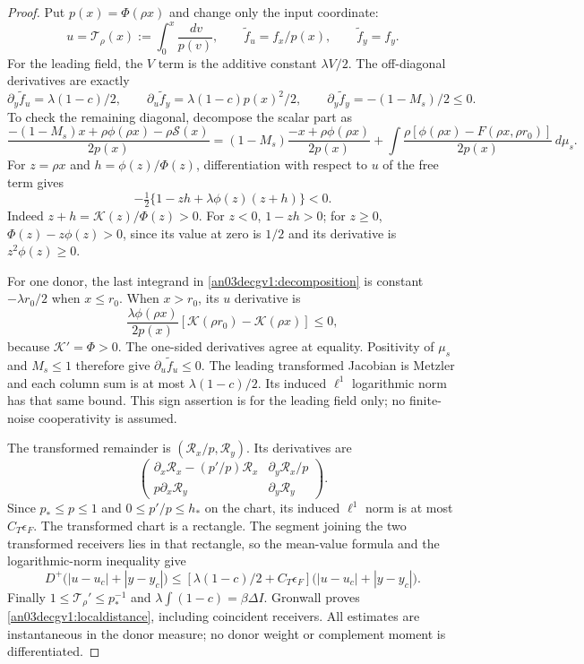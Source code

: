 \documentclass[11pt]{article}
\theoremstyle{remark}\newtheorem{remark}[proposition]{Remark}
\newcommand{\dd}{\,d}
\newcommand{\cR}{\mathcal R}
\begin{document}
\begin{proof}
Put $p(x)=\Phi(\rho x)$ and change only the input coordinate:
\[
 u=\mathcal T_\rho(x):=\int_0^x\frac{\dd v}{p(v)},
 \qquad \widetilde f_u=f_x/p(x),\qquad \widetilde f_y=f_y.
\]
For the leading field, the $V$ term is the additive constant
$\lambda V/2$. The off-diagonal derivatives are exactly
\begin{equation}
 \partial_y\widetilde f_u=\lambda(1-c)/2,\qquad
 \partial_u\widetilde f_y=\lambda(1-c)p(x)^2/2,
 \qquad \partial_y\widetilde f_y=-(1-M_s)/2\le0.
 \label{an03decgv1:offdiagonals}
\end{equation}
To check the remaining diagonal, decompose the scalar part as
\begin{equation}
 \frac{-(1-M_s)x+\rho\phi(\rho x)-\rho\mathcal S(x)}{2p(x)}
 =(1-M_s)\frac{-x+\rho\phi(\rho x)}{2p(x)}
 +\int\frac{\rho[\phi(\rho x)-F(\rho x,\rho r_0)]}{2p(x)}
       \dd\mu_s.
 \label{an03decgv1:decomposition}
\end{equation}
For $z=\rho x$ and $h=\phi(z)/\Phi(z)$, differentiation
with respect to $u$ of the free term gives
\[
 -\tfrac12\{1-zh+\lambda\phi(z)(z+h)\}<0.
\]
Indeed $z+h=\mathcal K(z)/\Phi(z)>0$. For $z<0$, $1-zh>0$;
for $z\ge0$, $\Phi(z)-z\phi(z)>0$, since its value at zero
is $1/2$ and its derivative is $z^2\phi(z)\ge0$.

For one donor, the last integrand in
\eqref{an03decgv1:decomposition} is constant $-\lambda r_0/2$
when $x\le r_0$. When $x>r_0$, its $u$ derivative is
\[
 \frac{\lambda\phi(\rho x)}{2p(x)}
       [\mathcal K(\rho r_0)-\mathcal K(\rho x)]\le0,
\]
because $\mathcal K'=\Phi>0$. The one-sided derivatives agree
at equality. Positivity of $\mu_s$ and $M_s\le1$ therefore
give $\partial_u\widetilde f_u\le0$.
The leading transformed Jacobian is Metzler and each column
sum is at most $\lambda(1-c)/2$. Its induced $\ell^1$
logarithmic norm has that same bound. This sign assertion is
for the leading field only; no finite-noise cooperativity is assumed.

The transformed remainder is $(\cR_x/p,\cR_y)$. Its derivatives
are
\[
 \begin{pmatrix}
  \partial_x\cR_x-(p'/p)\cR_x&\partial_y\cR_x/p\\
  p\partial_x\cR_y&\partial_y\cR_y
 \end{pmatrix}.
\]
Since $p_*\le p\le1$ and $0\le p'/p\le h_*$ on the chart,
its induced $\ell^1$ norm is at most $C_T\epsilon_F$.
The transformed chart is a rectangle. The segment joining
the two transformed receivers lies in that rectangle, so the
mean-value formula and the logarithmic-norm inequality give
\[
 D^+\bigl(|u-u_c|+|y-y_c|\bigr)
 \le[\lambda(1-c)/2+C_T\epsilon_F]
                 \bigl(|u-u_c|+|y-y_c|\bigr).
\]
Finally $1\le\mathcal T_\rho'\le p_*^{-1}$ and
$\lambda\int(1-c)=\beta\Delta I$. Gronwall proves
\eqref{an03decgv1:localdistance}, including coincident receivers.
All estimates are instantaneous in the donor measure; no donor
weight or complement moment is differentiated.
\end{proof}
\end{document}
